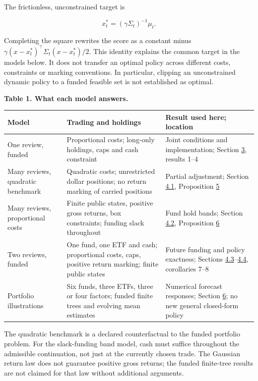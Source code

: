 \documentclass[11pt]{article}
\begin{document}
The frictionless, unconstrained target is

\begin{equation*}
x_t^*=(\gamma\Sigma_t)^{-1}\mu_t.
\tag{8}\label{eq:8}
\end{equation*}

Completing the square rewrites the score as a constant minus \(\gamma(x-x_t^*)^\top\Sigma_t(x-x_t^*)/2\). This identity explains the common target in the models below. It does not transfer an optimal policy across different costs, constraints or marking conventions. In particular, clipping an unconstrained dynamic policy to a funded feasible set is not established as optimal.

\label{tab:1}
\textbf{Table 1. What each model answers.}

{\footnotesize\setlength{\tabcolsep}{4pt}
\begin{longtable}{P{71pt}P{213pt}P{159pt}}
\toprule
\textbf{Model} & \textbf{Trading and holdings} & \textbf{Result used here; location} \\
\midrule
\endhead
\bottomrule
\endlastfoot
One review, funded & Proportional costs; long-only holdings, caps and cash constraint & Joint conditions and implementation; Section \hyperref[sec:3]{3}, results 1--4 \\
Many reviews, quadratic benchmark & Quadratic costs; unrestricted dollar positions; no return marking of carried positions & Partial adjustment; Section \hyperref[sec:4.1]{4.1}, Proposition \hyperref[res:Proposition-5]{5} \\
Many reviews, proportional costs & Finite public states, positive gross returns, box constraints; funding slack throughout & Fund hold bands; Section \hyperref[sec:4.2]{4.2}, Proposition \hyperref[res:Proposition-6]{6} \\
Two reviews, funded & One fund, one ETF and cash; proportional costs, caps, positive return marking; finite public states & Future funding and policy exactness; Sections \hyperref[sec:4.3]{4.3}--\hyperref[sec:4.4]{4.4}, corollaries 7--8 \\
Portfolio illustrations & Six funds, three ETFs, three or four factors; funded finite trees and evolving mean estimates & Numerical forecast responses; Section \hyperref[sec:6]{6}; no new general closed-form policy \\
\end{longtable}}

The quadratic benchmark is a declared counterfactual to the funded portfolio problem. For the slack-funding band model, cash must suffice throughout the admissible continuation, not just at the currently chosen trade. The Gaussian return law does not guarantee positive gross returns; the funded finite-tree results are not claimed for that law without additional arguments.
\end{document}

